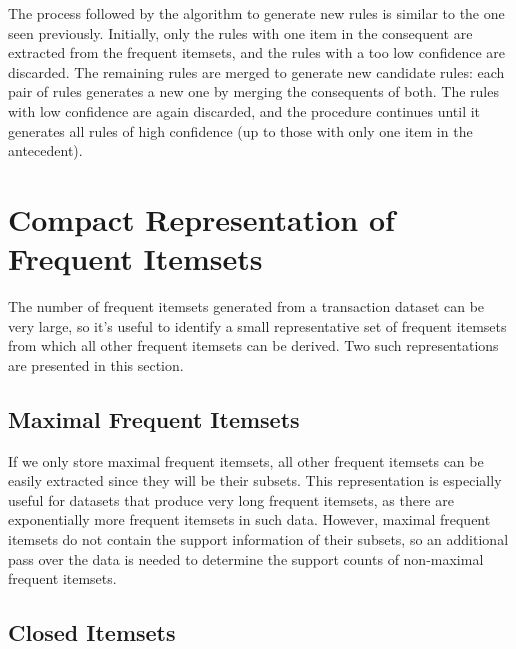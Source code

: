 The process followed by the algorithm to generate new rules is similar to the one seen previously. Initially, only the rules with one item in the consequent are extracted from the frequent itemsets, and the rules with a too low confidence are discarded. The remaining rules are merged to generate new candidate rules: each pair of rules generates a new one by merging the consequents of both. The rules with low confidence are again discarded, and the procedure continues until it generates all rules of high confidence (up to those with only one item in the antecedent).

\section{Compact Representation of Frequent Itemsets}

The number of frequent itemsets generated from a transaction dataset can be very large, so it's useful to identify a small representative set of frequent itemsets from which all other frequent itemsets can be derived. Two such representations are presented in this section.

\subsection{Maximal Frequent Itemsets}


If we only store maximal frequent itemsets, all other frequent itemsets can be easily extracted since they will be their subsets. This representation is especially useful for datasets that produce very long frequent itemsets, as there are exponentially more frequent itemsets in such data. However, maximal frequent itemsets do not contain the support information of their subsets, so an additional pass over the data is needed to determine the support counts of non-maximal frequent itemsets.

\subsection{Closed Itemsets}



